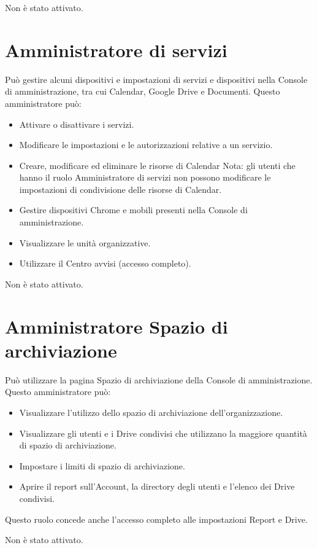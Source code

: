 Non è stato attivato.
\section{Amministratore di servizi}
Può gestire alcuni dispositivi e impostazioni di servizi e dispositivi nella Console di amministrazione, tra cui Calendar, Google Drive e Documenti. Questo amministratore può:
\begin{itemize}
\item Attivare o disattivare i servizi.
\item Modificare le impostazioni e le autorizzazioni relative a un servizio.
\item Creare, modificare ed eliminare le risorse di Calendar
Nota: gli utenti che hanno il ruolo Amministratore di servizi non possono modificare le impostazioni di condivisione delle risorse di Calendar.
\item Gestire dispositivi Chrome e mobili presenti nella Console di amministrazione.
\item Visualizzare le unità organizzative.
\item Utilizzare il Centro avvisi (accesso completo).
\end{itemize}
Non è stato attivato.
\section{Amministratore Spazio di archiviazione}
Può utilizzare la pagina Spazio di archiviazione della Console di amministrazione. Questo amministratore può:
\begin{itemize}
\item Visualizzare l'utilizzo dello spazio di archiviazione dell'organizzazione.
\item Visualizzare gli utenti e i Drive condivisi che utilizzano la maggiore quantità di spazio di archiviazione.
\item Impostare i limiti di spazio di archiviazione.
\item Aprire il report sull'Account, la directory degli utenti e l'elenco dei Drive condivisi.
\end{itemize}

Questo ruolo concede anche l'accesso completo alle impostazioni Report e Drive.

Non è stato attivato.